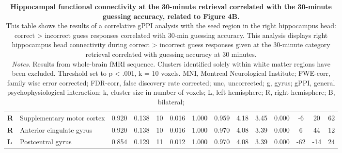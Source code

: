 \begin{landscape}
\begin{table}[!ht]
\begin{tabular}{ll|cccc|ccccc|ccc}
        \textbf{R} & Supplementary motor cortex & 0.920 & 0.138 & 10 & 0.016 & 1.000 & 0.959 & 4.18 & 3.45 & 0.000 & -6 & 20 & 62 \\
        \textbf{R} & Anterior cingulate gyrus & 0.920 & 0.138 & 10 & 0.016 & 1.000 & 0.970 & 4.08 & 3.39 & 0.000 & 6 & 44 & 12 \\
        \textbf{L} & Postcentral gyrus & 0.854 & 0.129 & 11 & 0.012 & 1.000 & 0.970 & 4.08 & 3.39 & 0.000 & -62 & -14 & 24 \\
\hline
    \end{tabular}
\vspace{1.0 em}
    \caption{\textbf{Hippocampal functional connectivity at the 30-minute retrieval correlated with the 30-minute guessing accuracy, related to Figure 4B.} \\ 
    This table shows the results of a correlative gPPI analysis with the seed region in the right hippocampus head: correct > incorrect guess responses correlated with 30-min guessing accuracy.
    This analysis displays right hippocampus head connectivity during correct > incorrect guess responses given at the 30-minute category retrieval correlated with guessing accuracy at 30 minutes. \\ 
    \vspace{1.0 em} \textit{Notes}. Results from whole-brain fMRI sequence. Clusters identified solely within white matter regions have been excluded. Threshold set to p < .001, k = 10 voxels. MNI, Montreal Neurological Institute; FWE-corr, family wise error corrected; FDR-corr, false discovery rate corrected; unc, uncorrected; g, gyrus; gPPI, general psychophysiological interaction; k, cluster size in number of voxels; L, left hemisphere; R, right hemisphere; B, bilateral; }
    \label{tab:Retrieval_unconscious_gPPI_SeedHippHead}
\end{table}
\end{landscape}